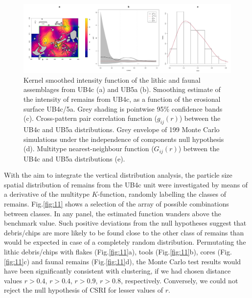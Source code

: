 \documentclass[review,authoryear,times]{elsarticle} %
\begin{document}
\begin{figure}[]
  \centering
  \includegraphics[width=1\textwidth]{../artwork/Fig10.pdf}
  \caption{Kernel smoothed intensity function of the lithic and faunal assemblages from UB4c (a) and UB5a (b). Smoothing estimate of the intensity of remains from UB4c, as a function of the erosional surface UB4c/5a. Grey shading is pointwise 95\% confidence bands (c). Cross-pattern pair correlation function ($g_{ij}(r)$) between the UB4c and UB5a distributions. Grey envelope of 199 Monte Carlo simulations under the independence of components null hypothesis (d). Multitype nearest-neighbour function ($G_{ij}(r)$) between the UB4c and UB5a distributions (e).}
  \label{fig:10}
\end{figure}

With the aim to integrate the vertical distribution analysis, the particle size spatial distribution of remains from the UB4c unit were investigated by means of a derivative of the multitype $K$-function, randomly labelling the classes of remains. Fig.\ref{fig:11} shows a selection of the array of possible combinations between classes. In any panel, the estimated function wanders above the benchmark value. Such positive deviations from the null hypotheses suggest that debris/chips are more likely to be found close to the other class of remains than would be expected in case of a completely random distribution. Permutating the lithic debris/chips with flakes (Fig.\ref{fig:11}a), tools (Fig.\ref{fig:11}b), cores (Fig.\ref{fig:11}c) and faunal remains (Fig.\ref{fig:11}d), the Monte Carlo test results would have been significantly consistent with clustering, if we had chosen distance values $r > 0.4$, $r > 0.4$, $r > 0.9$, $r > 0.8$, respectively. Conversely, we could not reject the null hypothesis of CSRI for lesser values of $r$.
\end{document}
